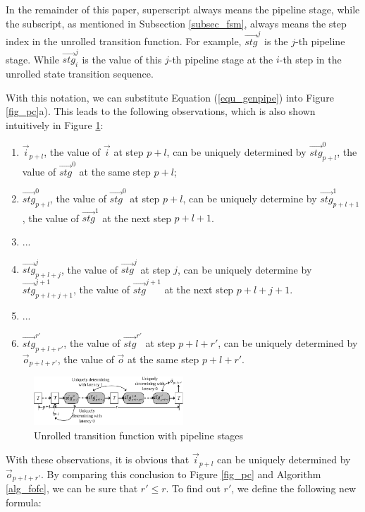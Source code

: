 \documentclass[conference]{IEEEtran}
\begin{document}
In the remainder of this paper,
superscript always means the pipeline stage,
while the subscript,
as mentioned in Subsection \ref{subsec_fsm},
always means the step index in the unrolled transition function.
For example,
$\vec{stg}^j$ is the $j$-th pipeline stage.
While $\vec{stg}^j_i$ is the value of this $j$-th pipeline stage 
at the $i$-th step in the unrolled state transition sequence.

With this notation,
we can substitute Equation (\ref{equ_genpipe}) into Figure \ref{fig_pc}a).
This leads to the following observations,
which is also shown intuitively in Figure \ref{fig_encexp}:

\begin{enumerate}
\item $\vec{i}_{p+l}$,
the value of $\vec{i}$ at step $p+l$,
can be uniquely determined by $\vec{stg}^0_{p+l}$,
the value of $\vec{stg}^0$ at the same step $p+l$;
 \item $\vec{stg}^0_{p+l}$,
the value of $\vec{stg}^0$ at step $p+l$,
can be uniquely determine by $\vec{stg}^{1}_{p+l+1}$,
the value of $\vec{stg}^{1}$ at the next step $p+l+1$.
 \item ...
 \item $\vec{stg}^{j}_{p+l+j}$,
 the value of $\vec{stg}^{j}$ at step $j$,
 can be uniquely determine by $\vec{stg}^{j+1}_{p+l+j+1}$,
 the value of $\vec{stg}^{j+1}$ at the next step $p+l+j+1$.
 \item ...
 \item $\vec{stg}^{r'}_{p+l+r'}$,
 the value of $\vec{stg}^{r'}$ at step $p+l+r'$,
 can be uniquely determined by $\vec{o}_{p+l+r'}$,
 the value of $\vec{o}$ at the same step $p+l+r'$.
\end{enumerate}



\begin{figure}[b]
\begin{center}
\includegraphics[width=0.5\textwidth]{encexp}
\end{center}
\caption{Unrolled transition function with pipeline stages}
  \label{fig_encexp}
\end{figure}

With these observations,
it is obvious that $\vec{i}_{p+l}$ can be uniquely determined by $\vec{o}_{p+l+r'}$.
By comparing this conclusion to Figure \ref{fig_pc} and Algorithm \ref{alg_fofc},
we can be sure that $r'\le r$.
To find out $r'$, 
we define the following new formula:
\end{document}
